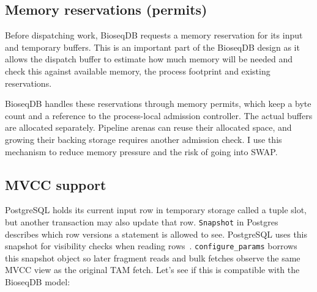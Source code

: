 \subsection{Memory reservations (permits)}
\label{sec:dispatch-memory-admission}

Before dispatching work, BioseqDB requests a memory reservation for
its input and temporary buffers. This is an important part of the BioseqDB design as it allows the dispatch buffer to estimate how much memory will be needed and check this against available memory, the process footprint and existing reservations.

BioseqDB handles these reservations through memory permits, which keep a byte count and a reference to the process-local admission controller. The actual buffers are allocated separately. Pipeline arenas can reuse their allocated space, and growing their backing storage requires another admission check. I use this mechanism to reduce memory pressure and the risk of going into SWAP.

\subsection{MVCC support}
\label{sec:scan-row-stability}

PostgreSQL holds its current input row in temporary storage called a tuple
slot, but another transaction may also update that row. \texttt{Snapshot} in Postgres describes which row versions a statement is allowed to see. PostgreSQL uses this snapshot for visibility checks when reading rows~\parencite{postgresql17_mvcc}.
\texttt{configure\_params} borrows this snapshot object so later fragment reads and bulk fetches observe the same MVCC view as the original TAM fetch.
Let's see if this is compatible with the BioseqDB model:

